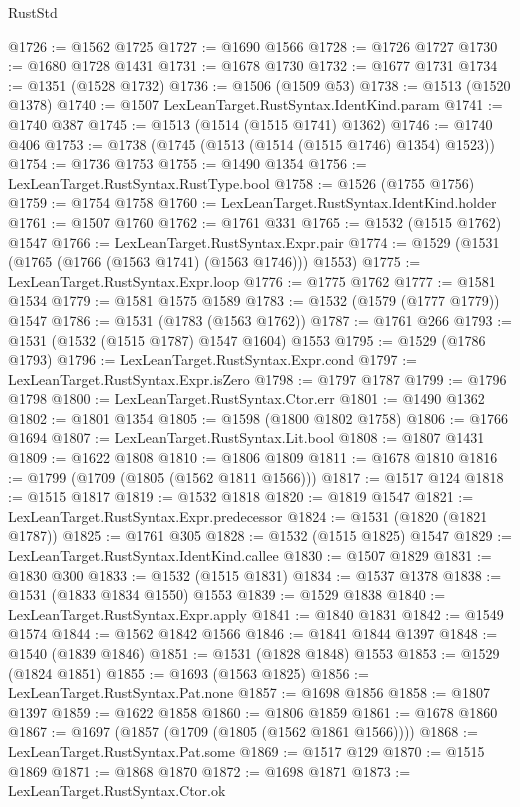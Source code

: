 \begin{lexlean}{RustStd}
\begin{coremodule}
{\begin{coremodule}
{{{{{{{{{{{{{{{{{{{{{{{{{{{{{{{{@1726 := @1562 @1725
@1727 := @1690 @1566
@1728 := @1726 @1727
@1730 := @1680 @1728 @1431
@1731 := @1678 @1730
@1732 := @1677 @1731
@1734 := @1351 (@1528 @1732)
@1736 := @1506 (@1509 @53)
@1738 := @1513 (@1520 @1378)
@1740 := @1507 LexLeanTarget.RustSyntax.IdentKind.param
@1741 := @1740 @387
@1745 := @1513 (@1514 (@1515 @1741) @1362)
@1746 := @1740 @406
@1753 := @1738 (@1745 (@1513 (@1514 (@1515 @1746) @1354) @1523))
@1754 := @1736 @1753
@1755 := @1490 @1354
@1756 := LexLeanTarget.RustSyntax.RustType.bool
@1758 := @1526 (@1755 @1756)
@1759 := @1754 @1758
@1760 := LexLeanTarget.RustSyntax.IdentKind.holder
@1761 := @1507 @1760
@1762 := @1761 @331
@1765 := @1532 (@1515 @1762) @1547
@1766 := LexLeanTarget.RustSyntax.Expr.pair
@1774 := @1529 (@1531 (@1765 (@1766 (@1563 @1741) (@1563 @1746))) @1553)
@1775 := LexLeanTarget.RustSyntax.Expr.loop
@1776 := @1775 @1762
@1777 := @1581 @1534
@1779 := @1581 @1575 @1589
@1783 := @1532 (@1579 (@1777 @1779)) @1547
@1786 := @1531 (@1783 (@1563 @1762))
@1787 := @1761 @266
@1793 := @1531 (@1532 (@1515 @1787) @1547 @1604) @1553
@1795 := @1529 (@1786 @1793)
@1796 := LexLeanTarget.RustSyntax.Expr.cond
@1797 := LexLeanTarget.RustSyntax.Expr.isZero
@1798 := @1797 @1787
@1799 := @1796 @1798
@1800 := LexLeanTarget.RustSyntax.Ctor.err
@1801 := @1490 @1362
@1802 := @1801 @1354
@1805 := @1598 (@1800 @1802 @1758)
@1806 := @1766 @1694
@1807 := LexLeanTarget.RustSyntax.Lit.bool
@1808 := @1807 @1431
@1809 := @1622 @1808
@1810 := @1806 @1809
@1811 := @1678 @1810
@1816 := @1799 (@1709 (@1805 (@1562 @1811 @1566)))
@1817 := @1517 @124
@1818 := @1515 @1817
@1819 := @1532 @1818
@1820 := @1819 @1547
@1821 := LexLeanTarget.RustSyntax.Expr.predecessor
@1824 := @1531 (@1820 (@1821 @1787))
@1825 := @1761 @305
@1828 := @1532 (@1515 @1825) @1547
@1829 := LexLeanTarget.RustSyntax.IdentKind.callee
@1830 := @1507 @1829
@1831 := @1830 @300
@1833 := @1532 (@1515 @1831)
@1834 := @1537 @1378
@1838 := @1531 (@1833 @1834 @1550) @1553
@1839 := @1529 @1838
@1840 := LexLeanTarget.RustSyntax.Expr.apply
@1841 := @1840 @1831
@1842 := @1549 @1574
@1844 := @1562 @1842 @1566
@1846 := @1841 @1844 @1397
@1848 := @1540 (@1839 @1846)
@1851 := @1531 (@1828 @1848) @1553
@1853 := @1529 (@1824 @1851)
@1855 := @1693 (@1563 @1825)
@1856 := LexLeanTarget.RustSyntax.Pat.none
@1857 := @1698 @1856
@1858 := @1807 @1397
@1859 := @1622 @1858
@1860 := @1806 @1859
@1861 := @1678 @1860
@1867 := @1697 (@1857 (@1709 (@1805 (@1562 @1861 @1566))))
@1868 := LexLeanTarget.RustSyntax.Pat.some
@1869 := @1517 @129
@1870 := @1515 @1869
@1871 := @1868 @1870
@1872 := @1698 @1871
@1873 := LexLeanTarget.RustSyntax.Ctor.ok
}}}}}}}}}}}}}}}}}}}}}}}}}}}}}}}}
\end{coremodule}}
\end{coremodule}
\end{lexlean}

